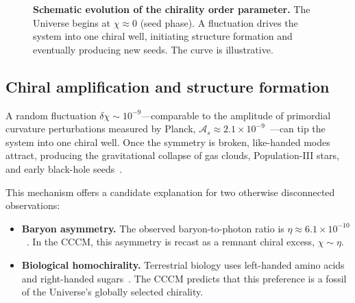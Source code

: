 \documentclass[a4paper,11pt]{article}
\newcommand{\CCCM}{CCCM}
\begin{document}
\begin{figure}[htbp]
\centering
{}
\caption{\textbf{Schematic evolution of the chirality order parameter.} The Universe begins at $\chi \approx 0$ (seed phase). A fluctuation drives the system into one chiral well, initiating structure formation and eventually producing new seeds. The curve is illustrative.}
\label{fig:phase}
\end{figure}

\subsection{Chiral amplification and structure formation}

A random fluctuation $\delta \chi \sim 10^{-9}$---comparable to the amplitude of primordial curvature perturbations measured by Planck, $\mathcal{A}_s \approx 2.1\times 10^{-9}$~\cite{Planck2018}---can tip the system into one chiral well. Once the symmetry is broken, like-handed modes attract, producing the gravitational collapse of gas clouds, Population-III stars, and early black-hole seeds~\cite{Bromm2009,Volonteri2010}.

This mechanism offers a candidate explanation for two otherwise disconnected observations:
\begin{itemize}
    \item \textbf{Baryon asymmetry.} The observed baryon-to-photon ratio is $\eta \approx 6.1\times 10^{-10}$~\cite{Planck2018}. In the \CCCM, this asymmetry is recast as a remnant chiral excess, $\chi \sim \eta$.
    \item \textbf{Biological homochirality.} Terrestrial biology uses left-handed amino acids and right-handed sugars~\cite{Blackmond2010}. The \CCCM{} predicts that this preference is a fossil of the Universe's globally selected chirality.
\end{itemize}
\end{document}
